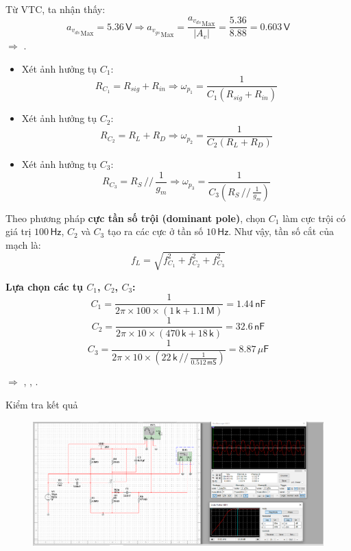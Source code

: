 
Từ VTC, ta nhận thấy:
\[
{a_{v_{ds}}}_{\text{Max}}=5.36\,\textsf{V}
\Rightarrow {a_{v_{gs}}}_{\text{Max}}=\frac{{a_{v_{ds}}}_{\text{Max}}}{\left|A_{v}\right|}=\frac{5.36}{8.88}=0.603\,\textsf{V}
\]
$\Rightarrow$ .


\begin{itemize}[label=-]
	\item Xét ảnh hưởng tụ $C_{1}$: 
	\[
	R_{C_{1}}=R_{sig}+R_{in}
	\Longrightarrow \omega_{p_{1}}=\frac{1}{C_{1}\left(R_{sig}+R_{in}\right)}
	\]
	
	\item Xét ảnh hưởng tụ $C_{2}$: 
	\[
	R_{C_{2}}=R_{L}+R_{D}
	\Longrightarrow \omega_{p_{2}}=\frac{1}{C_{2}\left(R_{L}+R_{D}\right)}
	\]
	
	\item Xét ảnh hưởng tụ $C_{3}$: 
	\[
	R_{C_{3}}=R_{S}\,//\,\frac{1}{g_{m}}
	\Longrightarrow \omega_{p_{3}}=\frac{1}{C_{3}\left(R_{S}\,//\,\frac{1}{g_{m}}\right)}
	\]
\end{itemize}

Theo phương pháp \textbf{cực tần số trội (dominant pole)}, chọn $C_{1}$ làm cực trội có giá trị $100\,\textsf{Hz}$, 
$C_{2}$ và $C_{3}$ tạo ra các cực ở tần số $10\,\textsf{Hz}$.  
Như vậy, tần số cắt của mạch là:
\[
f_{L}=\sqrt{f_{C_{1}}^{2}+f_{C_{2}}^{2}+f_{C_{3}}^{2}}
\]

\textbf{Lựa chọn các tụ $C_{1}$, $C_{2}$, $C_{3}$:}
\[
C_{1}=\frac{1}{2\pi\times100\times\left(1\,\textsf{k}+1.1\,\textsf{M}\right)}=1.44\,\textsf{nF}
\]
\[
C_{2}=\frac{1}{2\pi\times10\times(470\,\textsf{k}+18\,\textsf{k})}=32.6\,\textsf{nF}
\]
\[
C_{3}=\frac{1}{2\pi\times10\times\left(22\,\textsf{k}\,//\,\frac{1}{0.512\,\textsf{mS}}\right)}=8.87\,\mu\textsf{F}
\]

$\Rightarrow$ , , .

Kiểm tra kết quả

\begin{figure}[H]
	\centering
	\includegraphics[width=\linewidth]{./my-chapters/my-images/Question1/Câu 1 Hình 2 d.png}
\end{figure}
